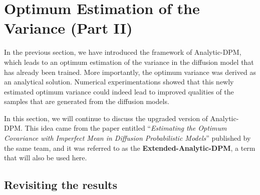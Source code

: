 \section{Optimum Estimation of the Variance (Part II)}

In the previous section, we have introduced the framework of Analytic-DPM, which leads to an optimum estimation of the variance in the diffusion model that has already been trained. More importantly, the optimum variance was derived as an analytical solution. Numerical experimentations showed that this newly estimated optimum variance could indeed lead to improved qualities of the samples that are generated from the diffusion models. 

In this section, we will continue to discuss the upgraded version of Analytic-DPM. This idea came from the paper entitled ``\emph{Estimating the Optimum Covariance with Imperfect Mean in Diffusion Probabilistic Models}''\cite{bao2022estimating} published by the same team, and it was referred to as the \textbf{Extended-Analytic-DPM}, a term that will also be used here.

\subsection{Revisiting the results}

